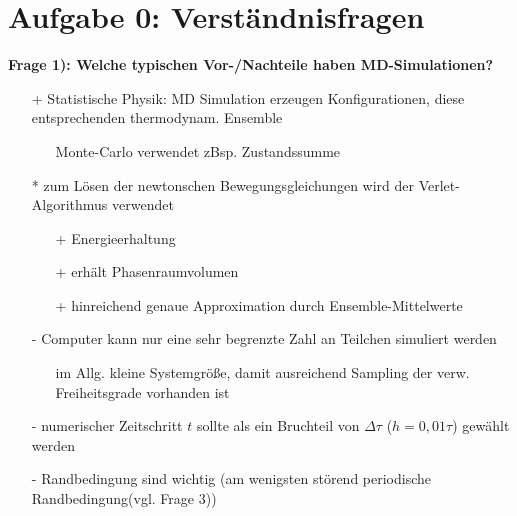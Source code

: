 \section*{Aufgabe 0: Verständnisfragen}

\textbf{Frage 1): Welche typischen Vor-/Nachteile haben MD-Simulationen?}\\
\begin{itemize}
  \item[+] Statistische Physik: MD Simulation erzeugen Konfigurationen, diese entsprechenden thermodynam. Ensemble
  \begin{itemize}
    \item[] Monte-Carlo verwendet zBsp. Zustandssumme
  \end{itemize}
  \item[*] zum Lösen der newtonschen Bewegungsgleichungen wird der Verlet-Algorithmus verwendet
  \begin{itemize}
    \item[+] Energieerhaltung
    \item[+] erhält Phasenraumvolumen
    \item[+] hinreichend genaue Approximation durch Ensemble-Mittelwerte
  \end{itemize}
  \item[-] Computer kann nur eine sehr begrenzte Zahl an Teilchen simuliert werden
  \begin{itemize}
    \item[] im Allg. kleine Systemgröße, damit ausreichend Sampling der verw. Freiheitsgrade vorhanden ist
  \end{itemize}
  \item[-] numerischer Zeitschritt $t$ sollte als ein Bruchteil von $\Delta\tau$ ($h=0,01 \tau$) gewählt werden
  \item[-] Randbedingung sind wichtig (am wenigsten störend periodische Randbedingung(vgl. Frage 3))
\end{itemize}


